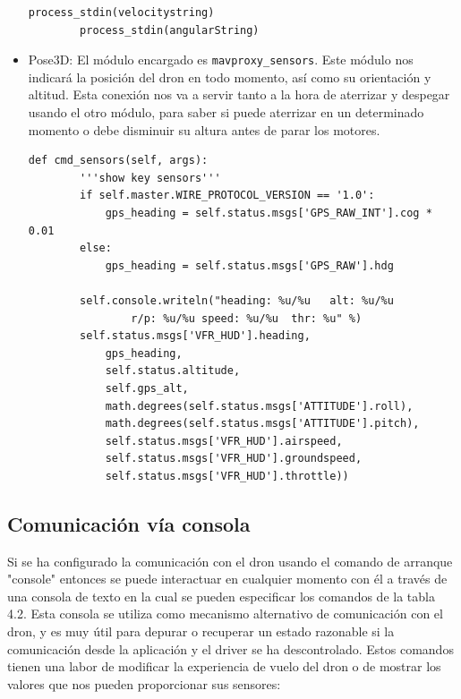 \begin{itemize}
\begin{lstlisting}[frame=single]
        process_stdin(velocitystring) 
        process_stdin(angularString)
\end{lstlisting}


\item Pose3D: El módulo encargado es \texttt{mavproxy\_sensors}. Este módulo nos indicará la posición del dron en todo momento, así como su orientación y altitud. Esta conexión nos va a servir tanto a la hora de aterrizar y despegar usando el otro módulo, para saber si puede aterrizar en un determinado momento o debe disminuir su altura antes de parar los motores.

\begin{lstlisting}[frame=single]
    def cmd_sensors(self, args):
        '''show key sensors'''
        if self.master.WIRE_PROTOCOL_VERSION == '1.0':
            gps_heading = self.status.msgs['GPS_RAW_INT'].cog * 0.01
        else:
            gps_heading = self.status.msgs['GPS_RAW'].hdg

        self.console.writeln("heading: %u/%u   alt: %u/%u  
        		r/p: %u/%u speed: %u/%u  thr: %u" %)
        self.status.msgs['VFR_HUD'].heading,
            gps_heading,
            self.status.altitude,
            self.gps_alt,
            math.degrees(self.status.msgs['ATTITUDE'].roll),
            math.degrees(self.status.msgs['ATTITUDE'].pitch),
            self.status.msgs['VFR_HUD'].airspeed,
            self.status.msgs['VFR_HUD'].groundspeed,
			self.status.msgs['VFR_HUD'].throttle))
\end{lstlisting}
\end{itemize}

\subsection{Comunicación vía consola}
Si se ha configurado la comunicación con el dron usando el comando de arranque "console" entonces se puede interactuar en cualquier momento con él a través de una consola de texto en la cual se pueden especificar los comandos de la tabla 4.2. Esta consola se utiliza como mecanismo alternativo de comunicación con el dron, y es muy útil para depurar o recuperar un estado razonable si la comunicación desde la aplicación y el driver se ha descontrolado. Estos comandos tienen una labor de modificar la experiencia de vuelo del dron o de mostrar los valores que nos pueden proporcionar sus sensores:

